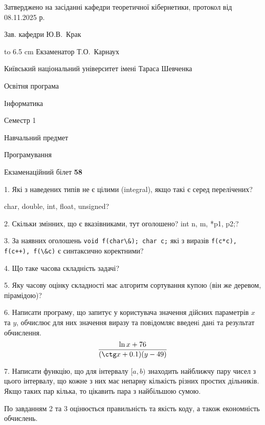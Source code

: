 \documentclass[12pt, ukrainian]{article}
\def\code#1{\Verb!#1!}
\begin{document}
{\smallskip\smallskip \begin {scriptsize} Затверджено на засіданні кафедри теоретичної кібернетики, протокол   від   08.11.2025 р.\par\smallskip\smallskip\smallskip\smallskip
{\parbox {6.5 cm} {Зав. кафедри \dotfill Ю.В.~Крак}}\hspace {0.7cm} {\hbox to 6.5 cm { Екзаменатор \dotfill Т.О.~Карнаух}} \end{scriptsize}}
\vspace{0.9cm}
{{\begin {scriptsize}\par
{ \center  Київський національний університет імені Тараса Шевченка \par}
{\parbox {5 cm}{Освітня програма \hfill}{\parbox {7 cm}{Інформатика\hfill}}\parbox {6 cm}{\hfill Семестр 1}}\par
{\parbox {5 cm} {Навчальний предмет \hfill}\parbox {7 cm}{Програмування \hfill}\parbox {6cm}{\hfill}\par}\vspace{-15pt} \end{scriptsize}}{\center Екзаменаційний білет \No \textbf { 58 }\par}}
{%
1. Які з наведених типів не є цілими (integral), якщо такі є серед перелічених?

char, double, int, float, unsigned?
\par
\vspace{2mm}
2. Скільки змінних, що є вказівниками, тут оголошено?
int n, m, *p1, p2;?
\par
\vspace{2mm}
3. За наявних оголошень \code{void f(char\&); char c;} які з виразів \code{f(c*c), f(c++), f(\&c)} є синтаксично коректними?
\par
\vspace{2mm}
4. Що таке часова складність задачі?
\par
\vspace{2mm}
5. Яку часову оцінку складності має алгоритм сортування купою (він же деревом, пірамідою)?
\par
\vspace{2mm}
6. Написати програму, що запитує у користувача значення дійсних параметрів $x$ та $y$, обчислює для них значення виразу та повiдомляє введенi данi та результат обчислення.
$$\frac{\ln x + 76}{(\ctg x + 0.1) (y - 49)}$$ 

\par
7. Написати функцію, що для інтервалу $[a, b)$ знаходить найближчу пару чисел з цього інтервалу, що кожне з них має непарну кількість різних простих дільників. Якщо таких пар кілька, то цікавить пара з найбільшою сумою.

По завданням 2 та 3 оцінюється правильність та якість коду, а також економність обчислень.

}
\end{document}

